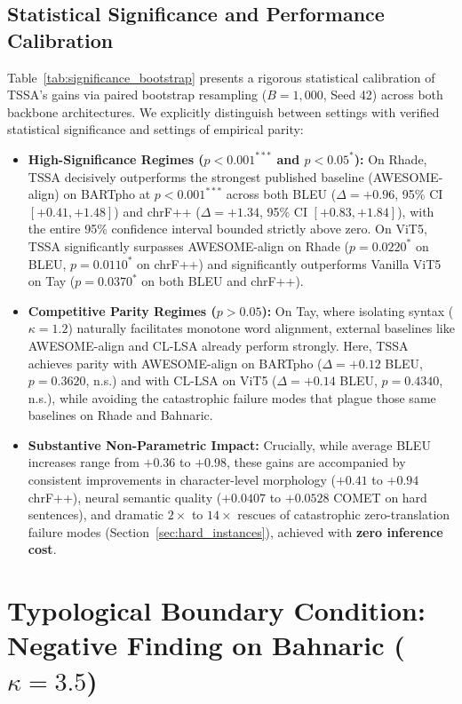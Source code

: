\documentclass[11pt]{article}
\begin{document}
\subsection{Statistical Significance and Performance Calibration}
Table~\ref{tab:significance_bootstrap} presents a rigorous statistical calibration of TSSA's gains via paired bootstrap resampling ($B=1,000$, Seed 42) across both backbone architectures. We explicitly distinguish between settings with verified statistical significance and settings of empirical parity:
\begin{itemize}[leftmargin=*]
    \item \textbf{High-Significance Regimes ($p < 0.001^{\ast\ast\ast}$ and $p < 0.05^*$):} On Rhade, TSSA decisively outperforms the strongest published baseline (AWESOME-align) on BARTpho at $p < 0.001^{\ast\ast\ast}$ across both BLEU ($\Delta = +0.96$, 95\% CI $[+0.41, +1.48]$) and chrF++ ($\Delta = +1.34$, 95\% CI $[+0.83, +1.84]$), with the entire 95\% confidence interval bounded strictly above zero. On ViT5, TSSA significantly surpasses AWESOME-align on Rhade ($p = 0.0220^*$ on BLEU, $p = 0.0110^*$ on chrF++) and significantly outperforms Vanilla ViT5 on Tay ($p = 0.0370^*$ on both BLEU and chrF++).
    \item \textbf{Competitive Parity Regimes ($p > 0.05$):} On Tay, where isolating syntax ($\kappa = 1.2$) naturally facilitates monotone word alignment, external baselines like AWESOME-align and CL-LSA already perform strongly. Here, TSSA achieves parity with AWESOME-align on BARTpho ($\Delta = +0.12$ BLEU, $p = 0.3620$, n.s.) and with CL-LSA on ViT5 ($\Delta = +0.14$ BLEU, $p = 0.4340$, n.s.), while avoiding the catastrophic failure modes that plague those same baselines on Rhade and Bahnaric.
    \item \textbf{Substantive Non-Parametric Impact:} Crucially, while average BLEU increases range from $+0.36$ to $+0.98$, these gains are accompanied by consistent improvements in character-level morphology ($+0.41$ to $+0.94$ chrF++), neural semantic quality ($+0.0407$ to $+0.0528$ COMET on hard sentences), and dramatic $2\times$ to $14\times$ rescues of catastrophic zero-translation failure modes (Section~\ref{sec:hard_instances}), achieved with \textbf{zero inference cost}.
\end{itemize}

\section{Typological Boundary Condition: Negative Finding on Bahnaric ($\kappa = 3.5$)}
\label{sec:bahnaric_case}
\end{document}
